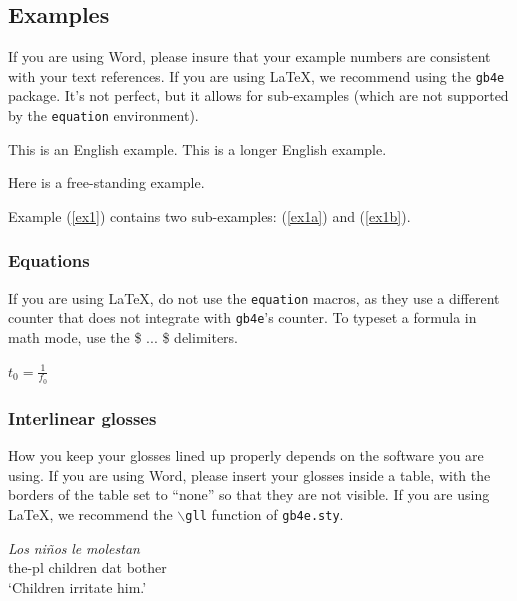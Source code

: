 \documentclass{tls}
\begin{document}
\subsection{Examples}

If you are using Word, please insure that your example numbers are consistent with your text references. If you are using \LaTeX, we recommend using the \texttt{gb4e} package. It's not perfect, but it allows for sub-examples (which are not supported by the \texttt{equation} environment).

\begin{exe}
  \ex\label{ex1}
    \begin{xlist}
      \ex\label{ex1a} This is an English example.
      \ex\label{ex1b} This is a longer English example.
    \end{xlist}
  \ex\label{ex2} Here is a free-standing example.
\end{exe}

Example (\ref{ex1}) contains two sub-examples: (\ref{ex1a}) and (\ref{ex1b}).

\subsubsection{Equations}

If you are using \LaTeX, do not use the \texttt{equation} macros, as they use a different counter that does not integrate with \texttt{gb4e}'s counter. To typeset a formula in math mode, use the \$ ... \$ delimiters.

\begin{exe}
  \ex $t_0 = \frac{1}{f_0}$
\end{exe}

\subsubsection{Interlinear glosses}

How you keep your glosses lined up properly depends on the software you are using. If you are using Word, please insert your glosses inside a table, with the borders of the table set to ``none'' so that they are not visible. If you are using \LaTeX, we recommend the \texttt{$\backslash$gll} function of \texttt{gb4e.sty}.

\begin{exe}
  \ex
    \gll \textit{Los} \textit{niños} \textit{le} \textit{molestan}\\
         the-{\sc pl} children {\sc dat} bother\\
    \glt `Children irritate him.'
\end{exe}
\end{document}
